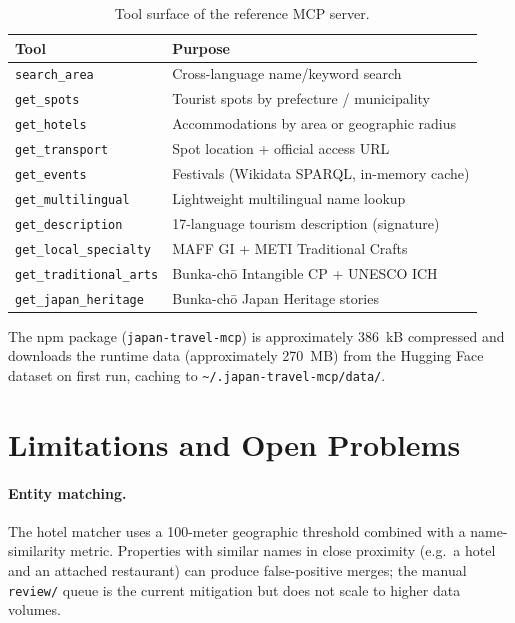 \documentclass[11pt,a4paper]{article}
\begin{document}
\begin{table}[h]
\centering
\small
\begin{tabular}{ll}
\toprule
\textbf{Tool} & \textbf{Purpose} \\
\midrule
\texttt{search\_area}        & Cross-language name/keyword search \\
\texttt{get\_spots}          & Tourist spots by prefecture / municipality \\
\texttt{get\_hotels}         & Accommodations by area or geographic radius \\
\texttt{get\_transport}      & Spot location + official access URL \\
\texttt{get\_events}         & Festivals (Wikidata SPARQL, in-memory cache) \\
\texttt{get\_multilingual}   & Lightweight multilingual name lookup \\
\texttt{get\_description}    & 17-language tourism description (signature) \\
\texttt{get\_local\_specialty}    & MAFF GI + METI Traditional Crafts \\
\texttt{get\_traditional\_arts}   & Bunka-ch\=o Intangible CP + UNESCO ICH \\
\texttt{get\_japan\_heritage}     & Bunka-ch\=o Japan Heritage stories \\
\bottomrule
\end{tabular}
\caption{Tool surface of the reference MCP server.}
\label{tab:tools}
\end{table}

The npm package (\texttt{japan-travel-mcp}) is approximately 386~kB
compressed and downloads the runtime data (approximately 270~MB) from
the Hugging Face dataset on first run, caching to
\texttt{\textasciitilde{}/.japan-travel-mcp/data/}.

\section{Limitations and Open Problems}
\label{sec:limitations}

\paragraph{Entity matching.} The hotel matcher uses a 100-meter geographic
threshold combined with a name-similarity metric. Properties with similar
names in close proximity (e.g.\ a hotel and an attached restaurant) can
produce false-positive merges; the manual \texttt{review/} queue is the
current mitigation but does not scale to higher data volumes.
\end{document}
